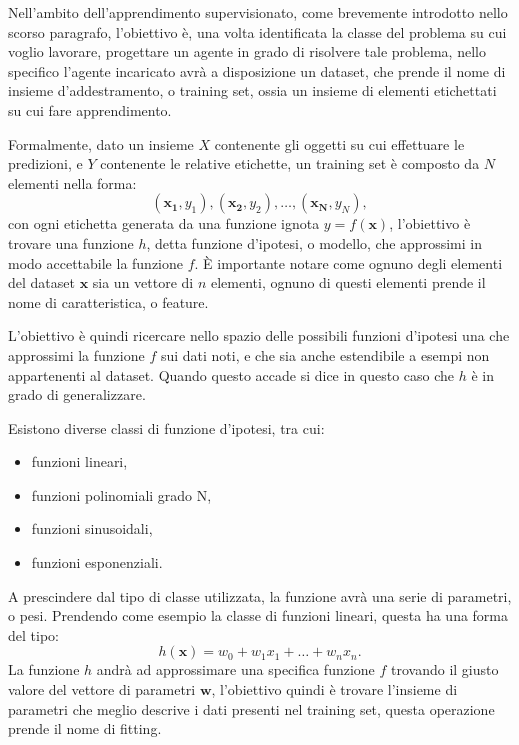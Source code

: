 \documentclass[../../main.tex]{subfiles}
\begin{document}
    Nell'ambito dell'apprendimento supervisionato, come brevemente introdotto nello scorso paragrafo, l'obiettivo è, una volta identificata la classe del problema su cui voglio lavorare, progettare un agente in grado di risolvere tale problema, nello specifico l'agente incaricato avrà a disposizione un dataset, che prende il nome di insieme d'addestramento, o training set, ossia un insieme di elementi etichettati su cui fare apprendimento.

    Formalmente, dato un insieme $X$ contenente gli oggetti su cui effettuare le predizioni, e $Y$ contenente le relative etichette, un training set è composto da $N$ elementi nella forma:
    \[(\boldsymbol{x_1}, y_1), (\boldsymbol{x_2}, y_2), \dots, (\boldsymbol{x_N}, y_N),\]
    con ogni etichetta generata da una funzione ignota $y = f(\boldsymbol{x})$, l'obiettivo è trovare una funzione $h$, detta funzione d'ipotesi, o modello, che approssimi in modo accettabile la funzione $f$. È importante notare come ognuno degli elementi del dataset $\boldsymbol{x}$ sia un vettore di $n$ elementi, ognuno di questi elementi prende il nome di caratteristica, o feature.

    L'obiettivo è quindi ricercare nello spazio delle possibili funzioni d'ipotesi una che approssimi la funzione $f$ sui dati noti, e che sia anche estendibile a esempi non appartenenti al dataset. Quando questo accade si dice in questo caso che $h$ è in grado di generalizzare.

    Esistono diverse classi di funzione d'ipotesi, tra cui:
    \begin{itemize}
        \item funzioni lineari,
        \item funzioni polinomiali grado N,
        \item funzioni sinusoidali,
        \item funzioni esponenziali.
    \end{itemize}

    A prescindere dal tipo di classe utilizzata, la funzione avrà una serie di parametri, o pesi. Prendendo come esempio la classe di funzioni lineari, questa ha una forma del tipo:
    \[ h(\boldsymbol{x}) = w_0 + w_1x_1 + \dots + w_nx_n .\]
    La funzione $h$ andrà ad approssimare una specifica funzione $f$ trovando il giusto valore del vettore di parametri $\boldsymbol{w}$, l'obiettivo quindi è trovare l'insieme di parametri che meglio descrive i dati presenti nel training set, questa operazione prende il nome di fitting. 
\end{document}
